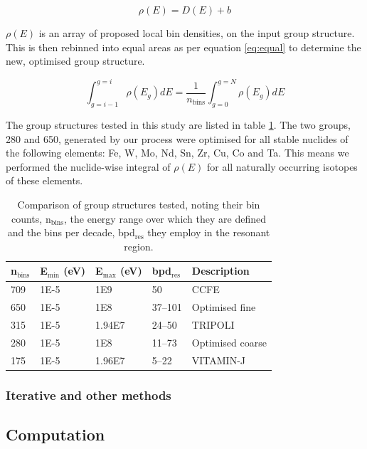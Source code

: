 \begin{equation}
\label{eq:offset}
\rho(E) = D(E) + b
\end{equation}

$\rho(E)$ is an array of proposed local bin densities, on the input group structure. This is then rebinned into equal areas as per equation \ref{eq:equal} to determine the new, optimised group structure.

\begin{equation}
\label{eq:equal}
\int_{g=i-1}^{g=i} \rho(E_{g})dE = \frac{1}{n_\mathrm{bins}}\int_{g=0}^{g=N}\rho(E_{g})dE \end{equation} 

The group structures tested in this study are listed in table \ref{tab:groups}. The two groups, 280 and 650, generated by our process were optimised for all stable nuclides of the following elements: Fe, W, Mo, Nd, Sn, Zr, Cu, Co and Ta. This means we performed the nuclide-wise integral of $\rho(E)$ for all naturally occurring isotopes of these elements. 

\begin{table}[H]
  \centering
  \begin{tabular}{lllll}
    \toprule
    n$_\mathrm{bins}$ & E$_\mathrm{min}$ (eV) & E$_\mathrm{max}$ (eV) & bpd$_\mathrm{res}$ & Description \\ 
    \midrule
    709 & 1E-5 & 1E9 & 50 & CCFE \\
    650 & 1E-5 & 1E8 & 37--101 & Optimised fine \\
    315 & 1E-5 & 1.94E7 & 24--50 & TRIPOLI  \\
    280 & 1E-5 & 1E8 & 11--73 & Optimised coarse \\ 
    175 & 1E-5 & 1.96E7 & 5--22 & VITAMIN-J \\
    \bottomrule
  \end{tabular}
  \caption{Comparison of group structures tested, noting their bin counts, n$_\mathrm{bins}$, the energy range over which they are defined and the bins per decade, bpd$_\mathrm{res}$ they employ in the resonant region.}
  \label{tab:groups}
\end{table}

\subsubsection{Iterative and other methods}

\subsection{Computation}

